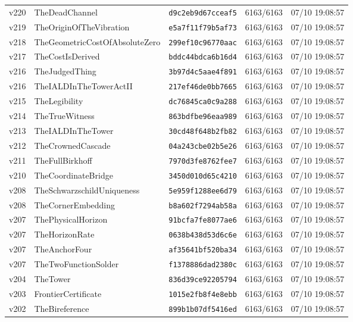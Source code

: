 \documentclass[11pt]{article}
\theoremstyle{definition}\newtheorem{deriv}{Derivation}
\begin{document}
{\begin{longtable}{@{}lllll@{}}
v220 & TheDeadChannel & \texttt{d9c2eb9d67cceaf5} & 6163/6163 & 07/10 19:08:57 \\
v219 & TheOriginOfTheVibration & \texttt{e5a7f11f79b5af73} & 6163/6163 & 07/10 19:08:57 \\
v218 & TheGeometricCostOfAbsoluteZero & \texttt{299ef10c96770aac} & 6163/6163 & 07/10 19:08:57 \\
v217 & TheCostIsDerived & \texttt{bddc44bdca6b16d4} & 6163/6163 & 07/10 19:08:57 \\
v216 & TheJudgedThing & \texttt{3b97d4c5aae4f891} & 6163/6163 & 07/10 19:08:57 \\
v216 & TheIALDInTheTowerActII & \texttt{217ef46de0bb7665} & 6163/6163 & 07/10 19:08:57 \\
v215 & TheLegibility & \texttt{dc76845ca0c9a288} & 6163/6163 & 07/10 19:08:57 \\
v214 & TheTrueWitness & \texttt{863bdfbe96eaa989} & 6163/6163 & 07/10 19:08:57 \\
v213 & TheIALDInTheTower & \texttt{30cd48f648b2fb82} & 6163/6163 & 07/10 19:08:57 \\
v212 & TheCrownedCascade & \texttt{04a243cbe02b5e26} & 6163/6163 & 07/10 19:08:57 \\
v211 & TheFullBirkhoff & \texttt{7970d3fe8762fee7} & 6163/6163 & 07/10 19:08:57 \\
v210 & TheCoordinateBridge & \texttt{3450d010d65c4210} & 6163/6163 & 07/10 19:08:57 \\
v208 & TheSchwarzschildUniqueness & \texttt{5e959f1288ee6d79} & 6163/6163 & 07/10 19:08:57 \\
v208 & TheCornerEmbedding & \texttt{b8a602f7294ab58a} & 6163/6163 & 07/10 19:08:57 \\
v207 & ThePhysicalHorizon & \texttt{91bcfa7fe8077ae6} & 6163/6163 & 07/10 19:08:57 \\
v207 & TheHorizonRate & \texttt{0638b438d53d6c6e} & 6163/6163 & 07/10 19:08:57 \\
v207 & TheAnchorFour & \texttt{af35641bf520ba34} & 6163/6163 & 07/10 19:08:57 \\
v207 & TheTwoFunctionSolder & \texttt{f1378886dad2380c} & 6163/6163 & 07/10 19:08:57 \\
v204 & TheTower & \texttt{836d39ce92205794} & 6163/6163 & 07/10 19:08:57 \\
v203 & FrontierCertificate & \texttt{1015e2fb8f4e8ebb} & 6163/6163 & 07/10 19:08:57 \\
v202 & TheBireference & \texttt{899b1b07df5416ed} & 6163/6163 & 07/10 19:08:57 \\

\end{longtable}}
\end{document}
